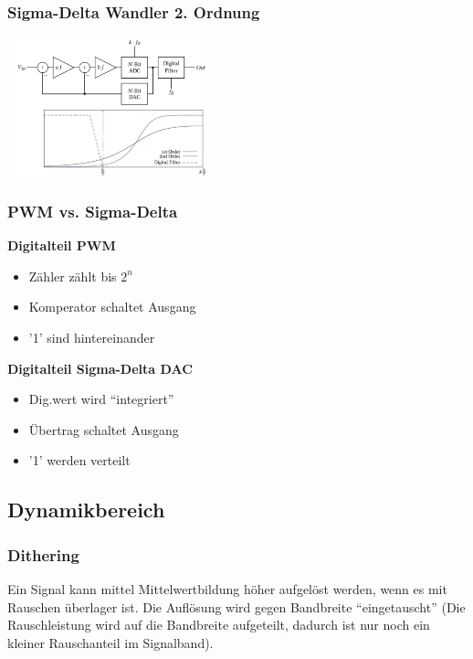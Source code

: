 \begin{multicols}{2}
  \subsubsection{Sigma-Delta Wandler 2. Ordnung}
    \includegraphics[width=6cm, height =4cm]{pictures/deltaSigma2}
  
  \columnbreak
  
  \subsubsection{PWM vs. Sigma-Delta}
      \textbf{Digitalteil PWM}
      \begin{itemize}
        \item Zähler zählt bis $2^n$
        \item Komperator schaltet Ausgang
        \item '1' sind hintereinander
      \end{itemize}
      
      \textbf{Digitalteil Sigma-Delta DAC}
      \begin{itemize}
        \item Dig.wert wird "`integriert"'
        \item Übertrag schaltet Ausgang
        \item '1' werden verteilt
      \end{itemize}
\end{multicols}

\subsection{Dynamikbereich}
\subsubsection{Dithering}
  Ein Signal kann mittel Mittelwertbildung höher aufgelöst werden, wenn es mit Rauschen überlager ist.
  Die Auflösung wird gegen Bandbreite "`eingetauscht"' (Die Rauschleistung wird auf die Bandbreite aufgeteilt,
  dadurch ist nur noch ein kleiner Rauschanteil im Signalband).
  
